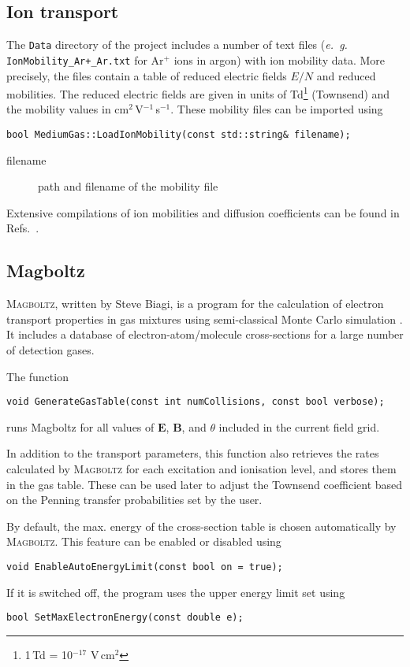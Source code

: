 \subsection{Ion transport}

The \texttt{Data} directory of the project includes a number of text files  
(\textit{e.~g.} \texttt{IonMobility\_Ar+\_Ar.txt} for Ar\(^{+}\) ions in argon) 
with ion mobility data. More precisely, the files contain
a table of reduced electric fields \(E/N\) and reduced mobilities.
The reduced electric fields are given in units of   
Td\footnote{1\,Td = 10\(^{-17}\) V\,cm\(^{2}\)} (Townsend) and the mobility values 
in cm\(^{2}\)\,V\(^{-1}\)\,s\(^{-1}\). 
These mobility files can be imported using
\begin{lstlisting}
bool MediumGas::LoadIonMobility(const std::string& filename);
\end{lstlisting}
\begin{description}
  \item[filename] path and filename of the mobility file
\end{description}
Extensive compilations of ion mobilities and diffusion coefficients 
can be found in Refs.~\cite{Ellis1976,Ellis1978,Ellis1984,Viehland1995}. 

\subsection{Magboltz}

\textsc{Magboltz}, written by Steve Biagi, is a program 
for the calculation of electron transport properties in gas 
mixtures using semi-classical Monte Carlo simulation
\cite{Biagi1999}. 
It includes a database of electron-atom/molecule cross-sections 
for a large number of detection gases. 

The function
\begin{lstlisting}
void GenerateGasTable(const int numCollisions, const bool verbose);
\end{lstlisting}
runs Magboltz for all values of \(\mathbf{E}\), \(\mathbf{B}\), 
and \(\theta\) included in the current field grid. 

In addition to the transport parameters, this function also 
retrieves the rates calculated by \textsc{Magboltz} for each excitation and 
ionisation level, and stores them in the gas table. These can be used 
later to adjust the Townsend coefficient based on the Penning transfer 
probabilities set by the user.

By default, the max. energy of the cross-section table  
is chosen automatically by \textsc{Magboltz}. This feature can be 
enabled or disabled using
\begin{lstlisting}
void EnableAutoEnergyLimit(const bool on = true);
\end{lstlisting} 
If it is switched off, the program uses the upper energy limit set using 
\begin{lstlisting}
bool SetMaxElectronEnergy(const double e);
\end{lstlisting}

